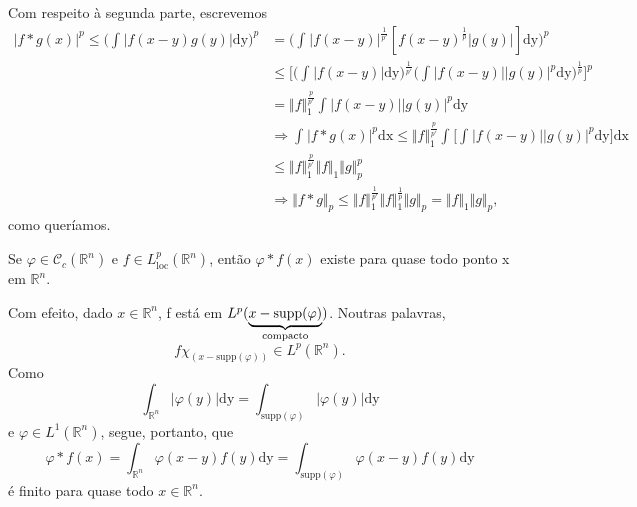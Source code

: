 \documentclass[../distribution_theory_notes.tex]{subfiles}
\begin{document}
\begin{proof*}
	Com respeito à segunda parte, escrevemos
	\begin{align*}
		|f*g(x)|^{p} \leq \biggl(\int_{}^{}|f(x-y)g(y)| \mathrm{dy}\biggr)^{p} & = \biggl(\int_{}^{}|f(x-y)|^{\frac{1}{p'}}[f(x-y)^{\frac{1}{p}}|g(y)|] \mathrm{dy}\biggr)^{p}                                                                    \\
		                                                                       & \leq \biggl[\biggl(\int_{}^{}|f(x-y)| \mathrm{dy}\biggr)^{\frac{1}{p'}}\biggl(\int_{}^{}|f(x-y)||g(y)|^{p} \mathrm{dy}\biggr)^{\frac{1}{p}}\biggr]^{p}           \\
		                                                                       & = \Vert f \Vert_{1}^{\frac{p}{p'}} \int_{}^{}|f(x-y)||g(y)|^{p} \mathrm{dy}                                                                                      \\
		                                                                       & \Rightarrow \int_{}^{}|f*g(x)|^{p} \mathrm{dx} \leq \Vert f \Vert_{1}^{\frac{p}{p'}}\int_{}^{}\biggl[\int_{}^{}|f(x-y)||g(y)|^{p} \mathrm{dy}\biggr] \mathrm{dx} \\
		                                                                       & \leq \Vert f \Vert_{1}^{\frac{p}{p'}}\Vert f \Vert_1 \Vert g \Vert_{p}^{p}                                                                                       \\
		                                                                       & \Rightarrow \Vert f*g \Vert_p \leq \Vert f \Vert_{1}^{\frac{1}{p'}}\Vert f \Vert_{1}^{\frac{1}{p}}\Vert g \Vert_p = \Vert f \Vert_1 \Vert g \Vert_p,
	\end{align*}
	como queríamos. \qedsymbol
\end{proof*}
\begin{crl*}
	Se \(\varphi \in \mathcal{C}_c(\mathbb{R}^{n})\) e \(f\in L_{\mathrm{loc}}^{p}(\mathbb{R}^{n})\), então \(\varphi *f(x)\) existe para quase todo ponto x em \(\mathbb{R}^{n}.\)
\end{crl*}
\begin{proof*}
	Com efeito, dado \(x\in \mathbb{R}^{n}\), f está em \(L^{p}(\underbrace{x-\mathrm{supp}(\varphi )}_{\mathclap{\text{compacto}}})\). Noutras palavras,
	\[
		f \chi_{(x-\mathrm{supp}(\varphi ))}\in L^{p}(\mathbb{R}^{n}).
	\]
	Como
	\[
		\int_{\mathbb{R}^{n}}^{}|\varphi(y)| \mathrm{dy} = \int_{\mathrm{supp}(\varphi )}^{}|\varphi(y)| \mathrm{dy}
	\]
	e \(\varphi \in L^{1}(\mathbb{R}^{n})\), segue, portanto, que
	\[
		\varphi * f(x) = \int_{\mathbb{R}^{n}}^{}\varphi (x-y)f(y) \mathrm{dy} = \int_{\mathrm{supp}(\varphi )}^{}\varphi(x-y)f(y) \mathrm{dy}
	\]
	é finito para quase todo \(x\in \mathbb{R}^{n}.\) \qedsymbol

\end{proof*}
\end{document}
